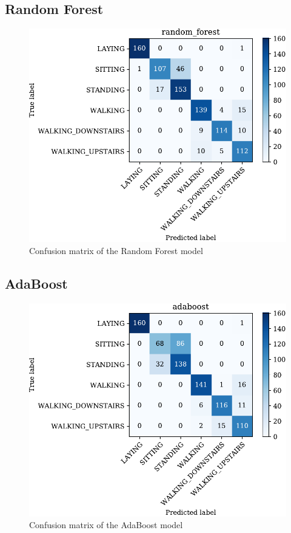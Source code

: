 \documentclass[conference,a4paper]{IEEEtran}
\begin{document}
\subsection{Random Forest}

\begin{figure}[htbp]
    \centering
    \includegraphics[width=0.8\columnwidth]{../plots/cm_random_forest.pdf}
    \caption{Confusion matrix of the Random Forest model}
    \label{fig:cm_rf}
\end{figure}

\subsection{AdaBoost}

\begin{figure}[htbp]
    \centering
    \includegraphics[width=0.8\columnwidth]{../plots/cm_adaboost.pdf}
    \caption{Confusion matrix of the AdaBoost model}
    \label{fig:cm_ab}
\end{figure}
\end{document}
